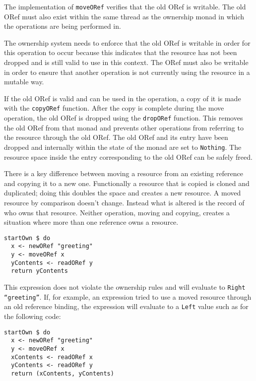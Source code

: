 \documentclass[onehalf,11pt]{beavtex}
\begin{document}
The implementation of \texttt{moveORef} verifies that the old ORef is writable.
The old ORef must also exist within the same thread as the ownership monad in
which the operations are being performed in.

The ownership system needs to enforce that the old ORef is
writable in order for this operation to occur because this indicates that the
resource has not been dropped and is still valid to use in this context.
The ORef must also be writable in order to ensure that another operation
is not currently using the resource in a mutable way.

If the old ORef is valid and can be used in the operation, a copy of it is made
with the \texttt{copyORef} function.
After the copy is complete during the move operation, the old ORef is dropped
using the \texttt{dropORef} function.
This removes the old ORef from that monad and prevents other operations from
referring to the resource through the old ORef.
The old ORef and its entry have been dropped and internally within the state of
the monad are set to \texttt{Nothing}.
The resource space inside the entry corresponding to the old ORef can be safely
freed.

There is a key difference between moving a resource from an existing reference
and copying it to a new one.  Functionally a resource that is copied is cloned
and duplicated; doing this doubles the space and creates a new resource.
A moved resource by comparison doesn't change.  Instead what is altered is the
record of who owns that resource.  Neither operation, moving and copying,
creates a situation where more than one reference owns a resource.

\begin{lstlisting}
startOwn $ do
  x <- newORef "greeting"
  y <- moveORef x
  yContents <- readORef y
  return yContents
\end{lstlisting}

This expression does not violate the ownership rules and will evaluate
to \texttt{Right ``greeting''}.
If, for example, an expression tried to use a moved resource through an
old reference binding, the expression will evaluate to a \texttt{Left} value
such as for the following code:

\begin{lstlisting}
startOwn $ do
  x <- newORef "greeting"
  y <- moveORef x
  xContents <- readORef x
  yContents <- readORef y
  return (xContents, yContents)
\end{lstlisting}
\end{document}
